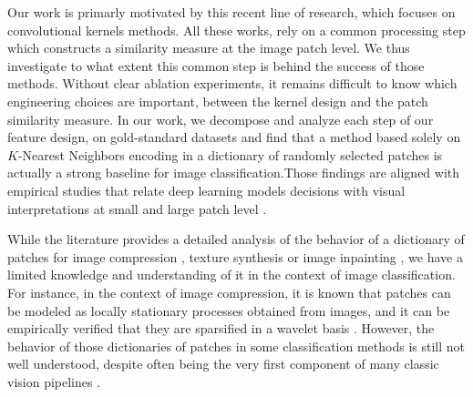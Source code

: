 \documentclass{article}
\newcommand{\mynotes}[1]{\textcolor{red}{#1}}
\begin{document}
Our work is primarly motivated by this recent line of research, which focuses on convolutional kernels methods. All these works, rely on a common processing step which constructs a similarity measure at the image patch level. We thus investigate to what extent this common step is behind the success of those methods. %
Without clear ablation experiments, it remains difficult to know which  engineering choices are important, between the kernel design and the patch similarity measure. 
In our work, we decompose and analyze each step of our feature design, on gold-standard  datasets and find that a method based solely on $K$-Nearest Neighbors encoding in a dictionary of randomly selected patches is actually a strong baseline for image classification.Those findings are aligned with  empirical studies that relate deep learning models decisions with visual interpretations at small and large patch level
\citep{zeiler2014visualizing,brendel2019approximating}.


 While the literature provides a detailed analysis of the behavior of a dictionary of patches for image compression
\citep{wallace1992jpeg}, texture synthesis \citep{efros1999texture} or image inpainting \citep{criminisi2004region}, we have a limited knowledge and understanding of it in the context of image classification. For instance, in the context of image compression, it is known that patches can be modeled as locally stationary processes obtained from images, and it can be empirically verified that they are sparsified in a wavelet basis \citep{mallat1999wavelet}. However, the behavior of those dictionaries of patches in some classification methods is still not well understood, despite often being the very first component of many classic vision pipelines \citep{perronnin2010improving,lowe2004distinctive,brendel2019approximating,oyallon2018scattering}.

\end{document}
